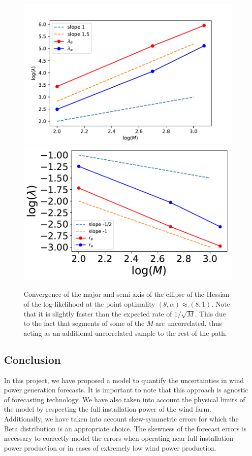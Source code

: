\documentclass[10pt,twocolumn,letterpaper]{article}
\begin{document}
\begin{figure}[t]
\begin{center}
   \includegraphics[width=0.5\linewidth]{Eigen_conv_samples_dN=14e-02.pdf}
   \includegraphics[width=0.5\linewidth]{ellipse_conv_samples_dN=14e-02.pdf}
\end{center}
   \caption{Convergence of the major and semi-axis of the ellipse  of the Hessian of the log-likelihood at the point optimality $(\theta, \alpha)\approx (8,1)$. Note that it is slightly faster than the expected rate of $1/\sqrt{M}$. This due to the fact that segments of some of the $M$ are uncorrelated, thus acting as an additional  uncorrelated sample to the rest of the path. }
\label{Ellipse_convergance}
\end{figure}
 
 




\subsection{Conclusion}

In this project, we have proposed a model to quantify the uncertainties in wind power generation forecasts. It is important to note that this approach is agnostic of forecasting technology. We have also taken into account the physical limits of the model by respecting the full installation power of the wind farm. Additionally, we have taken into account skew-symmetric errors for which the Beta distribution is an appropriate choice. The skewness of the forecast errors is necessary to correctly model the errors when operating near full installation power production or in cases of extremely low wind power production.
\end{document}
